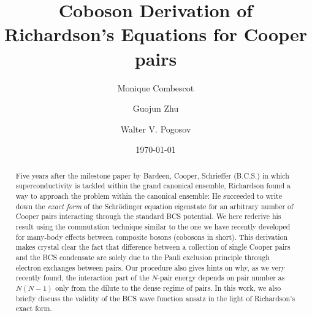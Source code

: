 \documentclass[aps,prb,superscriptaddress,twocolumn]{revtex4}
\begin{document}
\title{Coboson Derivation of Richardson's Equations for Cooper pairs}
\author{Monique Combescot}
\author{Guojun Zhu}
\author{Walter V. Pogosov}
\date{\today}

\begin{abstract}
Five years after the milestone paper by Bardeen, Cooper, Schrieffer (B.C.S.) in which
superconductivity is tackled within the grand canonical ensemble, Richardson found a way to approach the problem within the canonical ensemble: He succeeded to
write down the \textit{exact form} of the Schr\"{o}dinger equation eigenstate for
an arbitrary number of Cooper pairs interacting through the standard BCS
potential. We here rederive his result using the commutation technique similar to the one we
have recently developed for many-body effects between composite bosons
(cobosons in short). This derivation makes crystal clear the fact that difference
between a collection of single Cooper pairs and the BCS condensate are solely due to the Pauli exclusion principle
through electron exchanges between pairs. Our procedure also gives hints on
why, as we very recently found, the interaction part of the $N$-pair energy
depends on pair number as $N(N-1)$ only from the dilute to the dense regime
of pairs. In this work, we also briefly discuss the validity of the BCS wave
function ansatz in the light of Richardson's exact form.
\end{abstract}

\pacs{}
\maketitle

\end{document}
